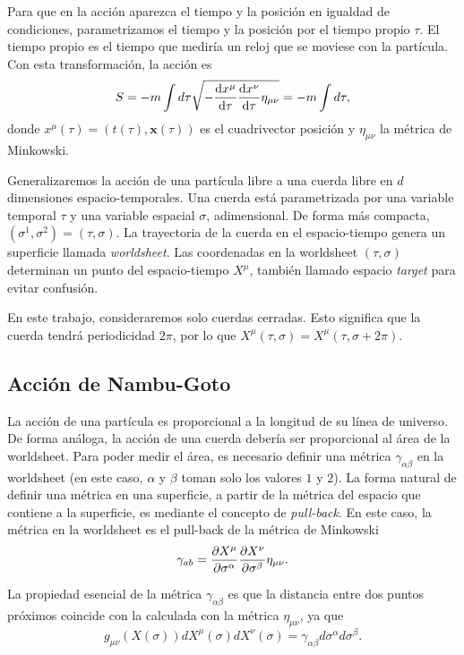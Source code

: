 Para que en la acción aparezca el tiempo y la posición en igualdad de condiciones,
parametrizamos el tiempo y la posición por el tiempo propio $\tau$. 
El tiempo propio es el tiempo que mediría un reloj que se moviese con la partícula.
Con esta transformación, la acción es
\begin{equation}
 S = -m\int d\tau \sqrt{-\dv{x^\mu}{\tau}\dv{x^\nu}{\tau}\eta_{\mu\nu}}=-m\int d\tau,
\end{equation}
donde $x^\mu(\tau)=(t(\tau),\mathbf x(\tau))$ es el cuadrivector posición y $\eta_{\mu\nu}$ la
métrica de Minkowski.

Generalizaremos la acción de una partícula libre a una cuerda libre en $d$ dimensiones espacio-temporales.
Una cuerda está parametrizada por una variable temporal $\tau$ y una variable espacial $\sigma$, adimensional.
De forma más compacta, $(\sigma^1,\sigma^2)=(\tau,\sigma)$. 
La trayectoria de la cuerda en el espacio-tiempo genera un superficie llamada \emph{worldsheet}.
Las coordenadas en la worldsheet $(\tau,\sigma)$ determinan un punto del espacio-tiempo $X^\mu$, también llamado
espacio \emph{target} para evitar confusión.

En este trabajo, consideraremos solo cuerdas cerradas. 
Esto significa que la cuerda tendrá periodicidad $2\pi$, por lo que $X^\mu(\tau,\sigma)=X^\mu(\tau,\sigma+2\pi)$.

\subsection{Acción de Nambu-Goto}

La acción de una partícula es proporcional a la longitud de su línea de universo.
De forma análoga, la acción de una cuerda debería ser proporcional al área de la
worldsheet.
Para poder medir el área, es necesario definir una métrica $\gamma_{\alpha\beta}$ en la worldsheet (en este caso, $\alpha$ y $\beta$ 
toman solo los valores $1$ y $2$).
La forma natural de definir una métrica en una superficie, a partir de la métrica del espacio que
contiene a la superficie, es mediante el concepto de \emph{pull-back}.
En este caso, la métrica en la worldsheet es el pull-back de la métrica de Minkowski
\begin{equation}
  \gamma_{ab}=\pdv{X^\mu}{\sigma^\alpha}\pdv{X^\nu}{\sigma^\beta}\eta_{\mu\nu}.
\end{equation}

La propiedad esencial de la métrica $\gamma_{\alpha\beta}$ es que la distancia entre dos puntos próximos 
coincide con la calculada con la métrica $\eta_{\mu\nu}$, ya que
\begin{equation}
  g_{\mu\nu}(X(\sigma)) dX^\mu(\sigma)dX^\nu(\sigma) = \gamma_{\alpha\beta} d\sigma^\alpha d\sigma^\beta.
\end{equation}


